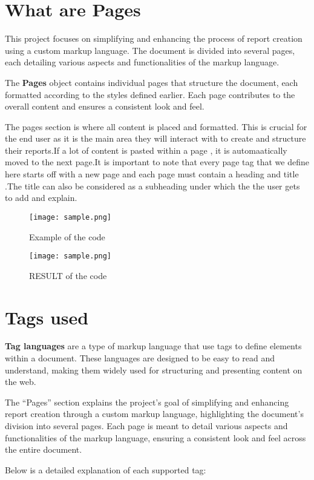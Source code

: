 \documentclass[oneside]{book}
\begin{document}
\section{What are Pages}
This project focuses on simplifying and enhancing the process of report creation using a custom markup language. The document is divided into several 
            pages, each detailing various aspects and functionalities of the markup language. \par
The \textbf{Pages} object contains individual pages that structure the document, each formatted according to the styles defined earlier. Each page contributes 
            to the overall content and ensures a consistent look and feel.\par
The pages section is where all content is placed and formatted. This is crucial for the end user as it is the main area they will interact with to create 
            and structure their reports.If a lot of content is pasted within a page , it is automaatically moved to the next page.It is important to note that every page 
            tag that we define here starts off with a new page and each page must contain a heading and title .The title can also be considered as a subheading under which the
            the user gets to add and explain.\par
\begin{figure}[h]
\centering
\texttt{[image: sample.png]}
\caption{Example of the code}
\end{figure}\begin{figure}[h]
\centering
\texttt{[image: sample.png]}
\caption{RESULT of the code}
\end{figure}\section{Tags used}
\textbf{Tag languages} are a type of markup language that use tags to define elements within a document. These languages are designed to be easy to read and 
            understand, making them widely used for structuring and presenting content on the web.\par
The ``Pages'' section explains the project's goal of simplifying and enhancing report creation through a custom markup language, highlighting the document's
            division into several pages. Each page is meant to detail various aspects and functionalities of the markup language, ensuring a consistent look and feel
            across the entire document.\par
Below is a detailed explanation of each supported tag:\par
\end{document}
